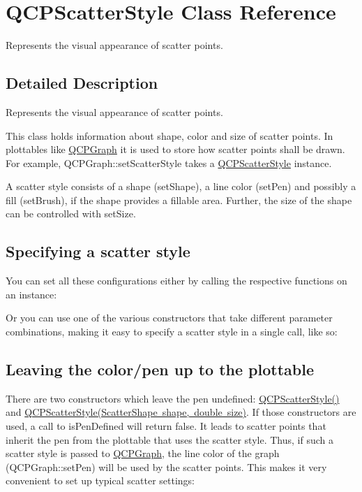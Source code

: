 \hypertarget{class_q_c_p_scatter_style}{}\section{Q\+C\+P\+Scatter\+Style Class Reference}
\label{class_q_c_p_scatter_style}


Represents the visual appearance of scatter points.  




\subsection{Detailed Description}
Represents the visual appearance of scatter points. 

This class holds information about shape, color and size of scatter points. In plottables like \mbox{\hyperlink{class_q_c_p_graph}{Q\+C\+P\+Graph}} it is used to store how scatter points shall be drawn. For example, Q\+C\+P\+Graph\+::set\+Scatter\+Style takes a \mbox{\hyperlink{class_q_c_p_scatter_style}{Q\+C\+P\+Scatter\+Style}} instance.

A scatter style consists of a shape (set\+Shape), a line color (set\+Pen) and possibly a fill (set\+Brush), if the shape provides a fillable area. Further, the size of the shape can be controlled with set\+Size.\hypertarget{class_q_c_p_scatter_style_QCPScatterStyle-defining}{}\subsection{Specifying a scatter style}\label{class_q_c_p_scatter_style_QCPScatterStyle-defining}
You can set all these configurations either by calling the respective functions on an instance\+: 
\begin{DoxyCodeInclude}
\end{DoxyCodeInclude}
 Or you can use one of the various constructors that take different parameter combinations, making it easy to specify a scatter style in a single call, like so\+: 
\begin{DoxyCodeInclude}
\end{DoxyCodeInclude}
 \hypertarget{class_q_c_p_scatter_style_QCPScatterStyle-undefinedpen}{}\subsection{Leaving the color/pen up to the plottable}\label{class_q_c_p_scatter_style_QCPScatterStyle-undefinedpen}
There are two constructors which leave the pen undefined\+: \mbox{\hyperlink{class_q_c_p_scatter_style}{Q\+C\+P\+Scatter\+Style()}} and \mbox{\hyperlink{class_q_c_p_scatter_style}{Q\+C\+P\+Scatter\+Style(\+Scatter\+Shape shape, double size)}}. If those constructors are used, a call to is\+Pen\+Defined will return false. It leads to scatter points that inherit the pen from the plottable that uses the scatter style. Thus, if such a scatter style is passed to \mbox{\hyperlink{class_q_c_p_graph}{Q\+C\+P\+Graph}}, the line color of the graph (Q\+C\+P\+Graph\+::set\+Pen) will be used by the scatter points. This makes it very convenient to set up typical scatter settings\+:



